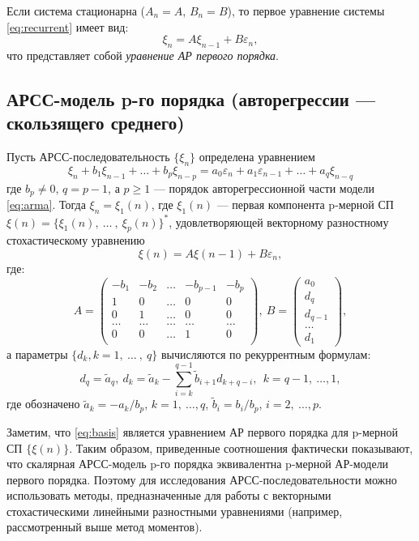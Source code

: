 \begin{remark}
Если система стационарна ($A_n = A$, $B_n = B$), то первое уравнение системы \eqref{eq:recurrent} имеет вид:
$$
    \xi_n = A \xi_{n-1} + B \varepsilon_n,
$$
что представляет собой \textit{уравнение АР первого порядка}.
\end{remark}


\subsection*{АРСС-модель p-го порядка (авторегрессии --- скользящего среднего)}
Пусть АРСС-последовательность $\{\xi_n\}$ определена уравнением
\begin{equation}
    \label{eq:arma}
    \xi_n + b_1 \xi_{n-1} + \dots + b_p \xi_{n-p} = a_0 \varepsilon_n + a_1 \varepsilon_{n-1} + \dots + a_q \xi_{n-q}
\end{equation}
где $b_p \neq 0$, $q = p - 1$, а $p \geq 1$ --- порядок авторегрессионной части модели \eqref{eq:arma}. Тогда $\xi_n = \xi_1(n)$, где $\xi_1(n)$ --- первая компонента p-мерной СП $\xi(n) = \{\xi_1(n),~\dots~,~ \xi_p(n)\}^*$, удовлетворяющей векторному разностному стохастическому уравнению
\begin{equation}
    \label{eq:basis}
    \xi(n) = A \xi(n-1) + B \varepsilon_n,
\end{equation}
где: 
\begin{equation}
    A = \begin{pmatrix}
            -b_1 & -b_2 & \dots & -b_{p-1} & -b_p \\
            1 & 0 & \dots & 0 & 0 \\
            0 & 1 & \dots & 0 & 0 \\
            \dots & \dots & \dots & \dots & \dots \\
            0 & 0 & \dots & 1 & 0 \\
        \end{pmatrix},~
        B = \begin{pmatrix}
            a_0 \\ d_q \\ d_{q-1} \\ \dots \\ d_1
        \end{pmatrix},
\end{equation}
а параметры $\{d_k, k=1,~\dots~,~q\}$ вычисляются по рекуррентным формулам:
\begin{equation}
    d_q = \tilde{a}_q,~d_k = \tilde{a}_k - \sum\limits_{i=k}^{q-1} \tilde b_{i+1}d_{k+q-i}, ~~ k = q-1,~\dots,1,
\end{equation}
где обозначено $\tilde{a}_k = -a_k / b_p$, $k = 1,~\dots,q$, $\tilde{b}_i = b_i / b_p$, $i = 2,~\dots,p$.

Заметим, что \eqref{eq:basis} является уравнением АР первого порядка для p-мерной СП $\{\xi(n)\}$. Таким образом, приведенные соотношения фактически показывают, что скалярная АРСС-модель p-го порядка эквивалентна p-мерной АР-модели первого порядка.
Поэтому для исследования АРСС-последовательности можно использовать методы, предназначенные для работы с векторными стохастическими линейными разностными уравнениями (например, рассмотренный выше метод моментов). 
